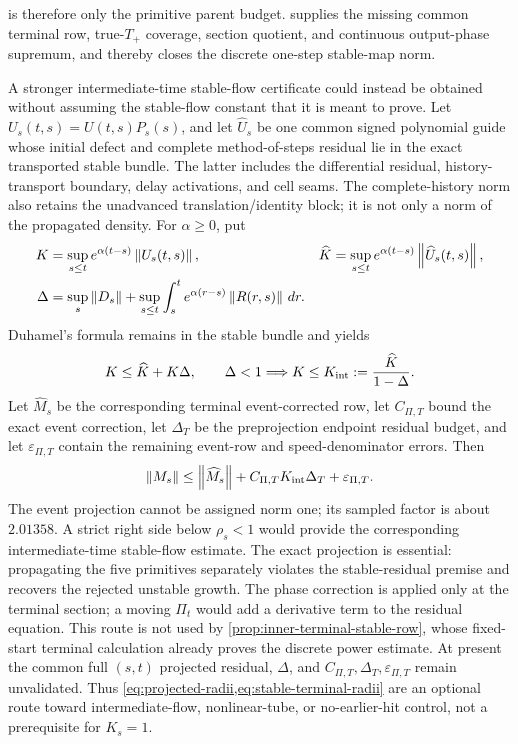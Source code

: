  is therefore only the primitive parent
budget.
 supplies the missing common terminal
row, true-\(T_+\) coverage, section quotient, and continuous output-phase
supremum, and thereby closes the discrete one-step stable-map norm.

A stronger intermediate-time stable-flow certificate could instead be
obtained without assuming the stable-flow constant that it is meant to prove.
Let \(U_s(t,s)=U(t,s)P_s(s)\), and let
\(\widehat U_s\) be one common signed polynomial guide whose initial defect
and complete method-of-steps residual lie in the exact transported stable
bundle.  The latter includes the differential residual, history-transport
boundary, delay activations, and cell seams.  The complete-history norm also
retains the unadvanced translation/identity block; it is not only a norm of
the propagated density.  For \(\alpha\ge0\), put
\begin{align*}
 K&=\sup_{s\le t}e^{\alpha(t-s)}\left\lVert U_s(t,s)\right\rVert,&
 \widehat K&=\sup_{s\le t}e^{\alpha(t-s)}
                    \left\lVert\widehat U_s(t,s)\right\rVert,\\
 \Delta&=\sup_s\left\lVert D_s\right\rVert
 +\sup_{s\le t}\int_s^t e^{\alpha(r-s)}
                    \left\lVert R(r,s)\right\rVert\,dr .
\end{align*}
Duhamel's formula remains in the stable bundle and yields
\begin{equation}
 K\le\widehat K+K\Delta,\qquad
 \Delta<1\Longrightarrow
 K\le K_{\rm int}:=\frac{\widehat K}{1-\Delta}.       \label{eq:projected-radii}
\end{equation}
Let \(\widehat M_s\) be the corresponding terminal event-corrected row, let
\(C_{\Pi,T}\) bound the exact event correction, let \(\Delta_T\) be the
preprojection endpoint residual budget, and let \(\varepsilon_{\Pi,T}\)
contain the remaining event-row and speed-denominator errors.  Then
\begin{equation}
 \left\lVert M_s\right\rVert\le\left\lVert\widehat M_s\right\rVert
                 +C_{\Pi,T}K_{\rm int}\Delta_T
                 +\varepsilon_{\Pi,T}.
                                                               \label{eq:stable-terminal-radii}
\end{equation}
The event projection cannot be assigned norm one; its sampled factor is
about \(2.01358\).  A strict right side below \(\rho_s<1\) would provide the
corresponding intermediate-time stable-flow estimate.  The exact projection
is essential: propagating the five primitives separately violates the
stable-residual premise and recovers the rejected unstable growth.  The phase
correction is applied only at the terminal section; a moving \(\Pi_t\) would
add a derivative term to the residual equation.  This route is not used by
\cref{prop:inner-terminal-stable-row}, whose fixed-start terminal calculation
already proves the discrete power estimate.  At present the common full
\((s,t)\) projected residual, \(\Delta\), and
\(C_{\Pi,T},\Delta_T,\varepsilon_{\Pi,T}\) remain unvalidated.  Thus
\cref{eq:projected-radii,eq:stable-terminal-radii} are an optional route toward
intermediate-flow, nonlinear-tube, or no-earlier-hit control, not a
prerequisite for \(K_s=1\).

